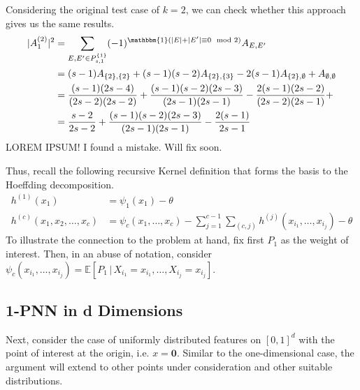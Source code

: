 \documentclass[letterpaper,10pt]{article}
\numberwithin{equation}{section}
\numberwithin{thm}{section}
\newcommand{\1}{\mathbb{1}}
\begin{document}
Considering the original test case of $k = 2$, we can check whether this approach gives us the same results.
\begin{equation*}
	\begin{aligned}
		|A_1^{(2)}|^2
		 & = \sum_{E, E' \in P_{s,1}^{\{1\}}} (-1)^{\mathbbm{1}(|E| + | E'| \equiv 0 \mod 2)}A_{E, E'}                                        \\
		 & = (s-1)A_{\{2\},\{2\}} + (s-1)(s-2)A_{\{2\},\{3\}} - 2(s-1)A_{\{2\}, \emptyset} + A_{\emptyset, \emptyset}                         \\
		 & = \frac{(s-1)(2s - 4)}{(2s - 2)(2s - 2)} + \frac{(s-1)(s-2)(2s - 3)}{(2s - 1)(2s - 1)} - \frac{2(s-1)(2s - 2)}{(2s - 2)(2s - 1)} + \\
		 & = \frac{s - 2}{2s - 2} + \frac{(s-1)(s-2)(2s - 3)}{(2s - 1)(2s - 1)} - \frac{2(s-1)}{2s - 1}                                       \\
	\end{aligned}
\end{equation*}
{\color{red} LOREM IPSUM! I found a mistake. Will fix soon.}

Thus, recall the following recursive Kernel definition that forms the basis to the Hoeffding decomposition.
\begin{align*}
	h^{(1)}(x_1)
	 & = \psi_1(x_1) - \theta                                                                                \\
	h^{(c)}(x_1, x_2, \dotsc, x_c)
	 & = \psi_c(x_1, \dotsc, x_c) - \sum_{j = 1}^{c-1}\sum_{(c,j)}h^{(j)}(x_{i_1}, \dotsc, x_{i_j}) - \theta
\end{align*}
To illustrate the connection to the problem at hand, fix first $P_1$ as the weight of interest.
Then, in an abuse of notation, consider $\psi_c(x_{i_1}, \dotsc, x_{i_j}) = \mathbb{E}\left[P_1 \, | \, X_{i_1} = x_{i_1}, \dotsc, X_{i_j} = x_{i_j}\right]$.

\subsection{1-PNN in d Dimensions}

Next, consider the case of uniformly distributed features on $[0,1]^d$ with the point of interest at the origin, i.e. $x = \mathbf{0}$.
Similar to the one-dimensional case, the argument will extend to other points under consideration and other suitable distributions.
\end{document}

